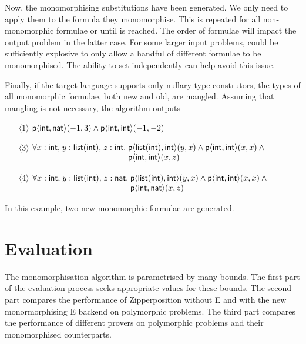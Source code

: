 \documentclass[runningheads]{llncs}
\begin{document}
Now, the monomorphising substitutions have been generated. We only need to apply them to the formula they monomorphise. This is repeated for all non-monomorphic formulae or until \Limit is reached. The order of formulae will impact the output problem in the latter case. For some larger input problems, \MonoSubst could be sufficiently explosive to only allow a handful of different formulae to be monomorphised. The ability to set \SubstLimit independently can help avoid this issue. 

Finally, if the target language supports only nullary type construtors, the types of all monomorphic formulae, both new and old, are mangled.
Assuming that mangling is not necessary, the algorithm outputs
\begin{enumerate}
   \item[\(\langle1\rangle\)] \(\textsf{p}\langle \textsf{int}, \textsf{nat}\rangle(-1, 3) \land \textsf{p}\langle \textsf{int}, \textsf{int}\rangle(-1, -2)\)
   \item[\(\langle3\rangle\)] \(\forall x: \textsf{int}{,}\; y:\textsf{list}(\textsf{int}){,}\; z: \textsf{int}{.}\; \begin{aligned}[t]
     & \textsf{p}\langle \textsf{list}(\textsf{int}), \textsf{int}\rangle(y, x) \land \textsf{p}\langle \textsf{int}, \textsf{int} \rangle(x, x) \land {} \\[-\jot]
     & \textsf{p}\langle \textsf{int}, \textsf{int}\rangle(x, z)\end{aligned}\)
   \item[\(\langle4\rangle\)] \(\forall x: \textsf{int}{,}\; y:\textsf{list}(\textsf{int}){,}\; z: \textsf{nat}{.}\; \begin{aligned}[t]
     & \textsf{p}\langle \textsf{list}(\textsf{int}), \textsf{int}\rangle(y, x) \land \textsf{p}\langle \textsf{int}, \textsf{int} \rangle(x, x) \land {} \\[-\jot]
     & \textsf{p}\langle \textsf{int}, \textsf{nat}\rangle(x, z)\end{aligned}\)
\end{enumerate}
In this example, two new monomorphic formulae are generated.

\section{Evaluation}
\label{sec:evaluation}

The monomorphisation algorithm is parametrised by many bounds. The first part of the evaluation process seeks appropriate values for these bounds. The second part compares the performance of Zipperposition without E and with the new monormorphising E backend on polymorphic problems. The third part compares the performance of different provers on polymorphic problems and their monomorphised counterparts.
\end{document}
